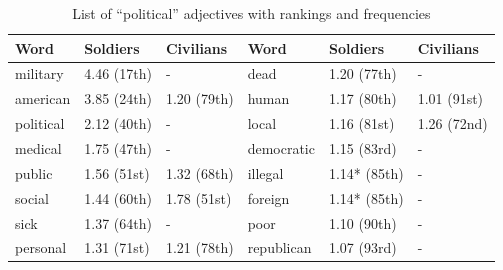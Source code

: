 \begin{table}[h]
  \caption{List of \enquote{political} adjectives with rankings and frequencies}
  \label{table:wordsComparison}
  \centering
  \renewcommand{\tabularxcolumn}{m} %
  \begin{tabularx}{0.8\textwidth}{l | l | l || l | l | l}
    \toprule
    \textbf{Word} & \textbf{Soldiers} & \textbf{Civilians} & \textbf{Word} & \textbf{Soldiers} & \textbf{Civilians}
    \tabularnewline \midrule
    military      & 4.46 (17th)       & -                  & dead          & 1.20 (77th)       & -
    \tabularnewline \hline
    american      & 3.85 (24th)       & 1.20 (79th)        & human         & 1.17 (80th)       & 1.01 (91st)
    \tabularnewline \hline
    political     & 2.12 (40th)       & -                  & local         & 1.16 (81st)       & 1.26 (72nd)
    \tabularnewline \hline
    medical       & 1.75 (47th)       & -                  & democratic    & 1.15 (83rd)       & -
    \tabularnewline \hline
    public        & 1.56 (51st)       & 1.32 (68th)        & illegal       & 1.14* (85th)      & -
    \tabularnewline \hline
    social        & 1.44 (60th)       & 1.78 (51st)        & foreign       & 1.14* (85th)      & -
    \tabularnewline \hline
    sick          & 1.37 (64th)       & -                  & poor          & 1.10 (90th)       & -
    \tabularnewline \hline
    personal      & 1.31 (71st)       & 1.21 (78th)        & republican    & 1.07 (93rd)       & -
    \tabularnewline \bottomrule
  \end{tabularx}
\end{table}
